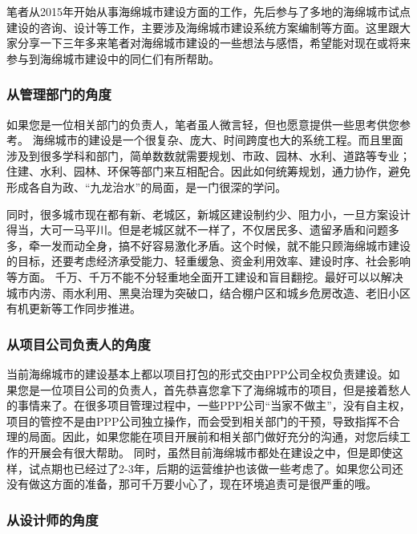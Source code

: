 \documentclass[]{book}
\begin{document}
笔者从2015年开始从事海绵城市建设方面的工作，先后参与了多地的海绵城市试点建设的咨询、设计等工作，主要涉及海绵城市建设系统方案编制等方面。这里跟大家分享一下三年多来笔者对海绵城市建设的一些想法与感悟，希望能对现在或将来参与到海绵城市建设中的同仁们有所帮助。

\hypertarget{ux4eceux7ba1ux7406ux90e8ux95e8ux7684ux89d2ux5ea6}{%
\subsubsection{从管理部门的角度}\label{ux4eceux7ba1ux7406ux90e8ux95e8ux7684ux89d2ux5ea6}}

如果您是一位相关部门的负责人，笔者虽人微言轻，但也愿意提供一些思考供您参考。
海绵城市的建设是一个很复杂、庞大、时间跨度也大的系统工程。而且里面涉及到很多学科和部门，简单数数就需要规划、市政、园林、水利、道路等专业；住建、水利、园林、环保等部门来互相配合。因此如何统筹规划，通力协作，避免形成各自为政、``九龙治水''的局面，是一门很深的学问。

同时，很多城市现在都有新、老城区，新城区建设制约少、阻力小，一旦方案设计得当，大可一马平川。但是老城区就不一样了，不仅居民多、遗留矛盾和问题多多，牵一发而动全身，搞不好容易激化矛盾。这个时候，就不能只顾海绵城市建设的目标，还要考虑经济承受能力、轻重缓急、资金利用效率、建设时序、社会影响等方面。
千万、千万不能不分轻重地全面开工建设和盲目翻挖。最好可以以解决城市内涝、雨水利用、黑臭治理为突破口，结合棚户区和城乡危房改造、老旧小区有机更新等工作同步推进。

\hypertarget{ux4eceux9879ux76eeux516cux53f8ux8d1fux8d23ux4ebaux7684ux89d2ux5ea6}{%
\subsubsection{从项目公司负责人的角度}\label{ux4eceux9879ux76eeux516cux53f8ux8d1fux8d23ux4ebaux7684ux89d2ux5ea6}}

当前海绵城市的建设基本上都以项目打包的形式交由PPP公司全权负责建设。如果您是一位项目公司的负责人，首先恭喜您拿下了海绵城市的项目，但是接着愁人的事情来了。在很多项目管理过程中，一些PPP公司``当家不做主''，没有自主权，项目的管控不是由PPP公司独立操作，而会受到相关部门的干预，导致指挥不合理的局面。因此，如果您能在项目开展前和相关部门做好充分的沟通，对您后续工作的开展会有很大帮助。
同时，虽然目前海绵城市都处在建设之中，但是即使这样，试点期也已经过了2-3年，后期的运营维护也该做一些考虑了。如果您公司还没有做这方面的准备，那可千万要小心了，现在环境追责可是很严重的哦。

\hypertarget{ux4eceux8bbeux8ba1ux5e08ux7684ux89d2ux5ea6}{%
\subsubsection{从设计师的角度}\label{ux4eceux8bbeux8ba1ux5e08ux7684ux89d2ux5ea6}}
\end{document}
